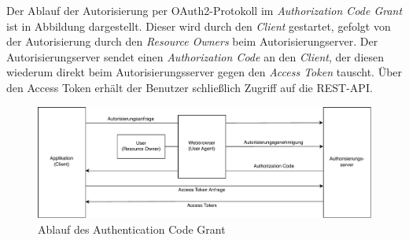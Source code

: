 Der Ablauf der Autorisierung per OAuth2-Protokoll im \textit{Authorization Code Grant} ist in Abbildung  dargestellt. 
Dieser wird durch den \textit{Client} gestartet, gefolgt von der Autorisierung durch den \textit{Resource Owners} beim Autorisierungserver. 
Der Autorisierungserver sendet einen \textit{Authorization Code} an den \textit{Client}, der diesen wiederum direkt beim Autorisierungsserver gegen den \textit{Access Token} tauscht. Über den Access Token erhält der Benutzer schließlich Zugriff auf die REST-API.

\begin{figure}[htbp]
\centering
\includegraphics[width=\textwidth]{Authentication_Code_Grant.pdf}
\caption{Ablauf des Authentication Code Grant}
\label{fig:auth-code-grant}
\end{figure}

